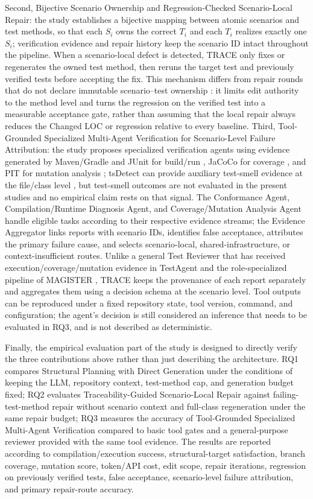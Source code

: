 \documentclass[pdflatex,sn-basic,Numbered,iicol]{sn-jnl}
\begin{document}
Second, Bijective Scenario Ownership and Regression-Checked Scenario-Local Repair: the study establishes a bijective mapping between atomic scenarios and test methods, so that each $S_i$ owns the correct $T_i$ and each $T_i$ realizes exactly one $S_i$; verification evidence and repair history keep the scenario ID intact throughout the pipeline. When a scenario-local defect is detected, TRACE only fixes or regenerates the owned test method, then reruns the target test and previously verified tests before accepting the fix. This mechanism differs from repair rounds that do not declare immutable scenario--test ownership \cite{bib26,bib4,bib27,bib28}: it limits edit authority to the method level and turns the regression on the verified test into a measurable acceptance gate, rather than assuming that the local repair always reduces the Changed LOC or regression relative to every baseline. Third, Tool-Grounded Specialized Multi-Agent Verification for Scenario-Level Failure Attribution: the study proposes specialized verification agents using evidence generated by Maven/Gradle and JUnit for build/run \cite{bib35}, JaCoCo for coverage \cite{bib33}, and PIT for mutation analysis \cite{bib34}; tsDetect can provide auxiliary test-smell evidence at the file/class level \cite{bib25}, but test-smell outcomes are not evaluated in the present studies and no empirical claim rests on that signal. The Conformance Agent, Compilation/Runtime Diagnosis Agent, and Coverage/Mutation Analysis Agent handle eligible tasks according to their respective evidence streams; the Evidence Aggregator links reports with scenario IDs, identifies false acceptance, attributes the primary failure cause, and selects scenario-local, shared-infrastructure, or context-insufficient routes. Unlike a general Test Reviewer that has received execution/coverage/mutation evidence in TestAgent \cite{bib23} and the role-specialized pipeline of MAGISTER \cite{bib31}, TRACE keeps the provenance of each report separately and aggregates them using a decision schema at the scenario level. Tool outputs can be reproduced under a fixed repository state, tool version, command, and configuration; the agent's decision is still considered an inference that needs to be evaluated in RQ3, and is not described as deterministic.

Finally, the empirical evaluation part of the study is designed to directly verify the three contributions above rather than just describing the architecture. RQ1 compares Structural Planning with Direct Generation under the conditions of keeping the LLM, repository context, test-method cap, and generation budget fixed; RQ2 evaluates Traceability-Guided Scenario-Local Repair against failing-test-method repair without scenario context and full-class regeneration under the same repair budget; RQ3 measures the accuracy of Tool-Grounded Specialized Multi-Agent Verification compared to basic tool gates and a general-purpose reviewer provided with the same tool evidence. The results are reported according to compilation/execution success, structural-target satisfaction, branch coverage, mutation score, token/API cost, edit scope, repair iterations, regression on previously verified tests, false acceptance, scenario-level failure attribution, and primary repair-route accuracy.
\end{document}
